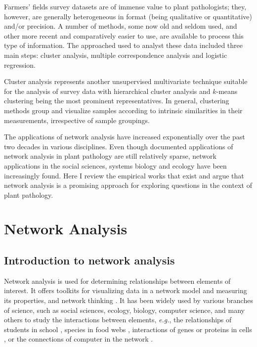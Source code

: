 \documentclass[12pt, oneside]{report}
\begin{document}
Farmers' fields survey datasets are of immense value to plant pathologists; they, however, are generally heterogeneous in format (being qualitative or quantitative) and/or precision. A number of methods, some now old and seldom used, and other more recent and comparatively easier to use, are available to process this type of information. The approached used to analyst these data included three main steps: cluster analysis, multiple correspondence analysis and logistic regression.

Cluster analysis represents another unsupervised multivariate technique suitable for the analysis of survey data with hierarchical cluster analysis and $k$-means clustering being the most prominent representatives. In general, clustering methods group and visualize samples according to intrinsic similarities in their measurements, irrespective of sample groupings. 


The applications of network analysis have increased exponentially over the past two decades in various disciplines. Even though documented applications of network analysis in plant pathology are still relatively sparse, network applications in the social sciences, systems biology and ecology have been increasingly found. Here I review the empirical works that exist and argue that network analysis is a promising approach for exploring questions in the context of plant pathology.




\section*{Network Analysis}
\subsection*{Introduction to network analysis}

Network analysis is used for determining relationships between elements of interest. It offers toolkits for visualizing data in a network model and measuring its properties, and network thinking \citep{PROULX:2005hx}. It has been widely used by various branches of science, such as social sciences, ecology, biology, computer science, and many others to study the interactions between elements, \textit{e.g.}, the relationships of students in school \citep{moody2001race}, species in food webs \citep{krause2003compartments}, interactions of genes or proteins in cells \citep{guimera2005functional}, or the connections of computer in the network \citep{pastor2001epidemic, newman2006modularity}.
\end{document}
